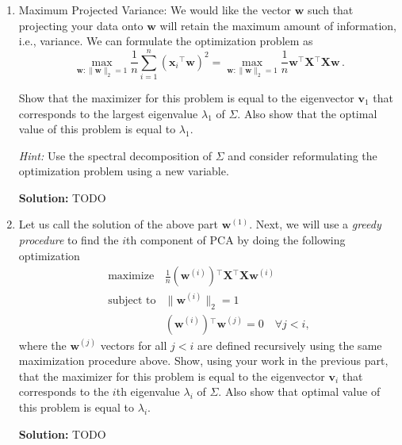 \documentclass{article}
\newcommand{\mat}[1]{\mathbf{#1}}
\renewcommand{\vec}[1]{\boldsymbol{\mathbf{#1}}}
\newcommand{\tran}{{}^{\!\top\!}}
\newcommand{\T}{\tran}
\newenvironment{solution}{\color{blue} \smallskip \textbf{Solution:}}{}
\begin{document}
\begin{enumerate}
\item Maximum Projected Variance: We would like the vector $\vec{w}$ such that projecting your data onto $\vec{w}$ will retain the maximum amount of
information, i.e., variance. We can formulate the optimization problem as
  \begin{equation}
  \label{eq:main}
    \max_{\vec{w} : \|\vec{w}\|_2 = 1} \frac{1}{n} \sum_{i=1}^n \left(\vec{x}_i\T \vec{w}\right)^2 = \max_{\vec{w} : \|\vec{w}\|_2 = 1}\frac{1}{n} \vec{w}\T \mat{X}\T \mat{X}\vec{w}\,.
  \end{equation}

Show that the maximizer for this problem is equal to the eigenvector $\vec{v}_1$ that corresponds to the
largest eigenvalue $\lambda_1$ of $\Sigma$. Also show that the optimal value of this problem is
equal to $\lambda_1$.

\textit{Hint:} Use the spectral decomposition of $\Sigma$ and consider reformulating the optimization problem using a new variable. 

\begin{solution}
    TODO
\end{solution}

\newpage
\item Let us call the solution of the above part $\vec{w}^{(1)}$.  Next, we will use a \emph{greedy
procedure} to find the $i$th component of PCA by doing the following optimization
\begin{equation}
  \begin{array}{ll}
    \text{maximize}   & \frac{1}{n}(\vec{w}^{(i)})\T \mat{X}\T \mat{X} \vec{w}^{(i)} \\
    \text{subject to}
        & \|\vec{w}^{(i)}\|_{2} = 1 \\
        & (\vec{w}^{(i)})\T \vec{w}^{(j)} = 0 \quad \forall j < i,
  \end{array}
\end{equation}
where the $\mat{w}^{(j)}$ vectors for all $j < i$ are defined recursively using the same maximization procedure above.
Show, using your work in the previous part, that the maximizer for this problem is equal to the eigenvector $\vec{v}_i$ that corresponds to the
$i$th eigenvalue $\lambda_i$ of $\Sigma$. Also show that optimal value of this problem is
equal to $\lambda_i$.

\begin{solution}
    TODO
\end{solution}
\end{enumerate}
\end{document}
